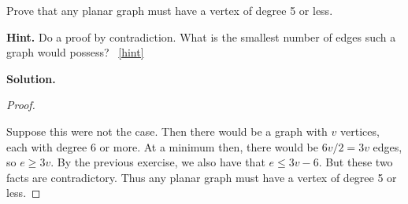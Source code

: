\documentclass{book}
\begin{document}
\setcounter{project}{31}
\addtocounter{project}{-1}
\begin{activity}[]\label{act-planardeg5}
\hypertarget{p-310}{}%
Prove that any planar graph must have a vertex of degree 5 or less.%
\par\smallskip%
\noindent\textbf{Hint.}\hypertarget{hint-10}{}\quad%
\hypertarget{p-311}{}%
Do a proof by contradiction.  What is the smallest number of edges such a graph would possess?%
~\hfill{\tiny\hyperlink{a-31}{[hint]}\hypertarget{q-31}{}}\par\smallskip%
\noindent\textbf{Solution.}\hypertarget{solution-23}{}\quad%
\begin{proof}\hypertarget{proof-4}{}
\hypertarget{p-312}{}%
Suppose this were not the case. Then there would be a graph with \(v\) vertices, each with degree 6 or more. At a minimum then, there would be \(6v/2 = 3v\) edges, so \(e \ge 3v\). By the previous exercise, we also have that \(e \le 3v - 6\). But these two facts are contradictory. Thus any planar graph must have a vertex of degree 5 or less.%
\end{proof}
\end{activity}

\clearpage
\end{document}
